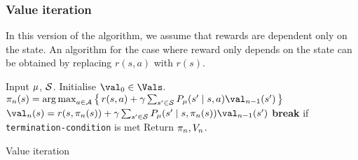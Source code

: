 \subsubsection{Value iteration}
In this version of the algorithm, we assume that rewards are dependent only on the state. An algorithm for the case where reward only depends on the state can be obtained by replacing $r(s,a)$ with $r(s)$.
\label{sec:value-iteration}
\begin{frame}
  \begin{algorithm}[H]
    \begin{algorithmic}
      \STATE Input $\mu$, ${\mathcal{S}}$.
      \STATE Initialise $\val_0 \in \Vals$. %
      \STATE $\pol_n(s) = \argmax_{a \in \CA} \set{r(s, a) + \disc \sum_{s' \in \CS} P_\mdp(s' \mid s, a) \val_{n-1} (s')}$
      \STATE $\val_n(s) = r(s, \pol_n(s)) + \disc \sum_{s' \in \CS} P_\mdp(s' \mid s, \pol_n(s)) \val_{n-1} (s')$
      \ENDFOR
      \STATE \textbf{break} if \texttt{termination-condition} is met %
      \ENDFOR
      \STATE Return $\pi_n, V_n$.
    \end{algorithmic}
    \caption{Value iteration}
  \end{algorithm}
\end{frame}

